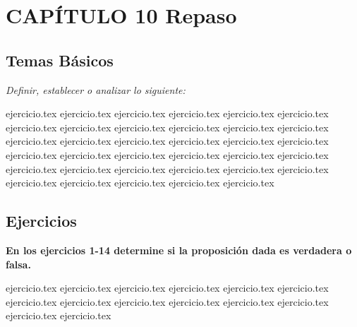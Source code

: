 
\section*{CAPÍTULO 10 \quad Repaso}

\subsection*{Temas Básicos}
\noindent\textit{Definir, establecer o analizar lo siguiente:}

\begin{enumerate}
    {ejercicio.tex}
{ejercicio.tex}
{ejercicio.tex}
{ejercicio.tex}
{ejercicio.tex}
{ejercicio.tex}
{ejercicio.tex}
{ejercicio.tex}
{ejercicio.tex}
{ejercicio.tex}
{ejercicio.tex}
{ejercicio.tex}
{ejercicio.tex}
{ejercicio.tex}
{ejercicio.tex}
{ejercicio.tex}
{ejercicio.tex}
{ejercicio.tex}
{ejercicio.tex}
{ejercicio.tex}
{ejercicio.tex}
{ejercicio.tex}
{ejercicio.tex}
{ejercicio.tex}
{ejercicio.tex}
{ejercicio.tex}
{ejercicio.tex}
{ejercicio.tex}
{ejercicio.tex}
{ejercicio.tex}
{ejercicio.tex}
{ejercicio.tex}
{ejercicio.tex}
{ejercicio.tex}
{ejercicio.tex}
\end{enumerate}

\vspace{0.8cm}
\subsection*{Ejercicios}

\noindent\textbf{En los ejercicios 1-14 determine si la proposición dada es verdadera o falsa.}
\begin{enumerate}
    {ejercicio.tex}
{ejercicio.tex}
{ejercicio.tex}
{ejercicio.tex}
{ejercicio.tex}
{ejercicio.tex}
{ejercicio.tex}
{ejercicio.tex}
{ejercicio.tex}
{ejercicio.tex}
{ejercicio.tex}
{ejercicio.tex}
{ejercicio.tex}
{ejercicio.tex}
\end{enumerate}

